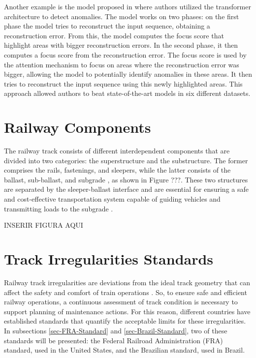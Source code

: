 Another example is the model proposed in \cite{tuli2022tranaddeeptransformernetworks} where authors utilized the transformer architecture to detect anomalies. The model works on two phases: on the first phase the model tries to reconstruct the input sequence, obtaining a reconstruction error. From this, the model computes the focus score that highlight areas with bigger reconstruction errors. In the second phase, it then computes a focus score from the reconstruction error. The focus score is used by the attention mechanism to focus on areas where the reconstruction error was bigger, allowing the model to potentially identify anomalies in these areas. It then tries to reconstruct the input sequence using this newly highlighted areas. This approach allowed authors to beat state-of-the-art models in six different datasets.

\section{Railway Components}

The railway track consists of different interdependent components that are divided into two categories: the superstructure and the substructure. The former comprises the rails, fastenings, and sleepers, while the latter consists of the ballast, sub-ballast, and subgrade \cite{kaewunruen12008dynamic}, as shown in Figure ???. These two structures are separated by the sleeper-ballast interface and are essential for ensuring a safe and cost-effective transportation system capable of guiding vehicles and transmitting loads to the subgrade \cite{attoh2017big}.

INSERIR FIGURA AQUI



\section{Track Irregularities Standards} \label{sec-track-defects}

Railway track irregularities are deviations from the ideal track geometry that can affect the safety and comfort of train operations \cite{Sansinena26032025}. So, to ensure safe and efficient railway operations, a continuous assessment of track condition is necessary to support planning of maintenance actions. For this reason, different countries have established standards that quantify the acceptable limits for these irregularities. In subsections \ref{sec-FRA-Standard} and \ref{sec-Brazil-Standard}, two of these standards will be presented: the Federal Railroad Administration (FRA) standard, used in the United States, and the Brazilian standard, used in Brazil.

